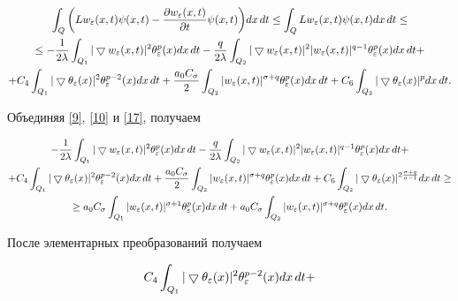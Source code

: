 \begin{pf}
\begin{multline}
\int_{Q}\bigg(Lw_\eps(x,t)\psi(x,t)-\frac{\dd


w_\eps(x,t)}{\dd t}\psi(x,t)\bigg) dx\,dt \le


\int_{Q}Lw_\eps(x,t)\psi(x,t) dx\,dt \le \\


%


\le -\frac{1}{2\lambda}\int_{Q_1}\mgrad^2\tmp dx\,dt-


\frac{q}{2\lambda}\int_{Q_2}


\mgrad^2|w_\eps(x,t)|^{q-1}\tmp dx\,dt +\\


%


+C_4 \int_{Q_1}\tgrad^2 \theta_\eps^{p-2}(x) dx\,dt +


\frac{a_0C_\sigma}{2}\int_{Q_2}|w_\eps(x,t)|^{\sigma+q}\tmp


dx\,dt+ C_6\int_{Q_2}\tgrad^{p} dx\,dt. \label{17}


\end{multline}


Объединяя \eqref{9}, \eqref{10} и \eqref{17}, получаем


\begin{multline*}


-\frac{1}{2\lambda}\int_{Q_1}\mgrad^2\tmp dx\,dt -


\frac{q}{2\lambda}\int_{Q_2} \mgrad^2


|w_\eps(x,t)|^{q-1}\tmp dx\,dt +\\


%


+C_4 \int_{Q_1}\tgrad^2 \theta_\eps^{p-2}(x) dx\,dt +


\frac{a_0C_\sigma}{2}\int_{Q_2}


|w_\eps(x,t)|^{\sigma+q}\tmp dx\,dt+


C_6\int_{Q_2}\tgrad^{2\frac{\sigma+q}{\sigma-1}} dx\,dt \ge \\


%


\ge a_0C_\sigma\int_{Q_1} |w_\eps(x,t)|^{\sigma+1}\tmp


dx\,dt + a_0C_\sigma\int_{Q_2}|w_\eps(x,t)|^{\sigma+q}\tmp dx\,dt.


\end{multline*}


После элементарных преобразований получаем


\begin{multline}


C_4 \int_{Q_1}\tgrad^2 \theta_\eps^{p-2}(x) dx\,dt +



\end{multline}
\end{pf}
